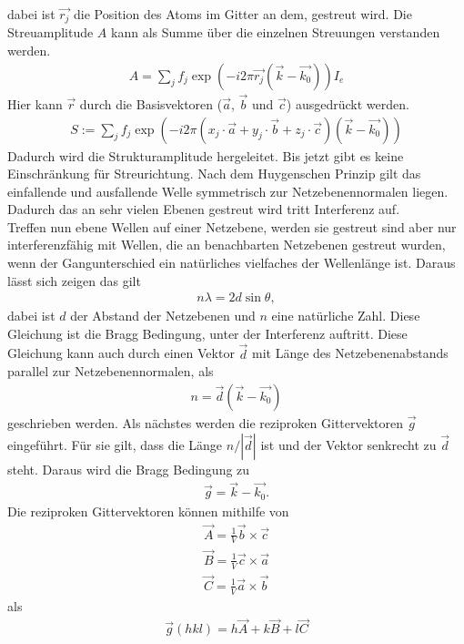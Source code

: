 dabei ist $\vec{r_j}$ die Position des Atoms im Gitter an dem, gestreut wird. Die Streuamplitude $A$ kann als Summe über die einzelnen Streuungen verstanden werden.
\begin{align}
	A = \sum_j f_j \exp(-i2\pi\vec{r_j}\left(\vec{k}-\vec{k_0}\right))I_e
\end{align}
Hier kann $\vec{r}$ durch die Basisvektoren ($\vec{a}$, $\vec{b}$ und $\vec{c}$) ausgedrückt werden.
\begin{align}
	S:= \sum_j f_j \exp(-i2\pi\left(x_j\cdot\vec{a}+y_j\cdot\vec{b}+z_j\cdot\vec{c}\right)\left(\vec{k}-\vec{k_0}\right))
\end{align}
Dadurch wird die Strukturamplitude hergeleitet. Bis jetzt gibt es keine Einschränkung für Streurichtung. Nach dem Huygenschen Prinzip gilt das einfallende und ausfallende Welle symmetrisch zur Netzebenennormalen liegen. Dadurch das an sehr vielen Ebenen gestreut wird tritt Interferenz auf.\\
Treffen nun ebene Wellen auf einer Netzebene, werden sie gestreut sind aber nur interferenzfähig mit Wellen, die an benachbarten Netzebenen gestreut wurden, wenn der Gangunterschied ein natürliches vielfaches der Wellenlänge ist. Daraus lässt sich zeigen das gilt
\begin{align}
	n\lambda = 2d\sin\theta,\label{eq:bragg}
\end{align}
dabei ist $d$ der Abstand der Netzebenen und $n$ eine natürliche Zahl. Diese Gleichung ist die Bragg Bedingung, unter der Interferenz auftritt. Diese Gleichung kann auch durch einen Vektor $\vec{d}$ mit Länge des Netzebenenabstands parallel zur Netzebenennormalen, als
\begin{align}
	n=\vec{d}\left(\vec{k}-\vec{k_0}\right)
\end{align}
geschrieben werden. Als nächstes werden die reziproken Gittervektoren $\vec{g}$ eingeführt.
Für sie gilt, dass die Länge $n/|\vec{d}|$ ist und der Vektor senkrecht zu $\vec{d}$ steht. Daraus wird die Bragg Bedingung zu 
\begin{align}
	\vec{g}=\vec{k}-\vec{k_0}.
\end{align}
Die reziproken Gittervektoren können mithilfe von 
\begin{align*}
	\vec{A}=\frac{1}{V}\vec{b}\times\vec{c}\\
	\vec{B}=\frac{1}{V}\vec{c}\times\vec{a}\\
	\vec{C}=\frac{1}{V}\vec{a}\times\vec{b}
\end{align*}
als
\begin{align}
	\vec{g}(hkl)=h\vec{A}+k\vec{B}+l\vec{C}
\end{align}

